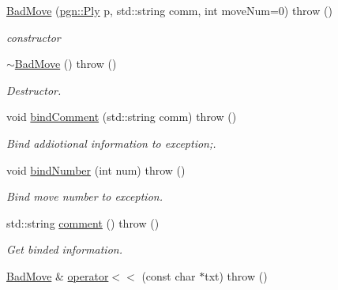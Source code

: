 \begin{DoxyCompactItemize}
\item 
\hyperlink{classChEngn_1_1BadMove_a581052f5203836b164bf25ce6e3e6b7a}{BadMove} (\hyperlink{classpgn_1_1Ply}{pgn::Ply} p, std::string comm, int moveNum=0)  throw ()
\begin{DoxyCompactList}\small\item\em constructor \item\end{DoxyCompactList}\item 
\hypertarget{classChEngn_1_1BadMove_a6efb8ca7c4af455b042eddf7ebbf2837}{
\hyperlink{classChEngn_1_1BadMove_a6efb8ca7c4af455b042eddf7ebbf2837}{$\sim$BadMove} ()  throw ()}
\label{classChEngn_1_1BadMove_a6efb8ca7c4af455b042eddf7ebbf2837}

\begin{DoxyCompactList}\small\item\em Destructor. \item\end{DoxyCompactList}\item 
void \hyperlink{classChEngn_1_1BadMove_a0006497750a3d96218b1dad586f5f8f1}{bindComment} (std::string comm)  throw ()
\begin{DoxyCompactList}\small\item\em Bind addiotional information to exception;. \item\end{DoxyCompactList}\item 
void \hyperlink{classChEngn_1_1BadMove_a1de119e2f1144a0e6906940df02bdaf8}{bindNumber} (int num)  throw ()
\begin{DoxyCompactList}\small\item\em Bind move number to exception. \item\end{DoxyCompactList}\item 
\hypertarget{classChEngn_1_1BadMove_a89df0bcb37e85792fd07e253503b4038}{
std::string \hyperlink{classChEngn_1_1BadMove_a89df0bcb37e85792fd07e253503b4038}{comment} ()  throw ()}
\label{classChEngn_1_1BadMove_a89df0bcb37e85792fd07e253503b4038}

\begin{DoxyCompactList}\small\item\em Get binded information. \item\end{DoxyCompactList}\item 
\hypertarget{classChEngn_1_1BadMove_a3d8bfdb14505483b67969196c24763f3}{
\hyperlink{classChEngn_1_1BadMove}{BadMove} \& \hyperlink{classChEngn_1_1BadMove_a3d8bfdb14505483b67969196c24763f3}{operator$<$$<$} (const char $\ast$txt)  throw ()}
\label{classChEngn_1_1BadMove_a3d8bfdb14505483b67969196c24763f3}


\end{DoxyCompactItemize}
